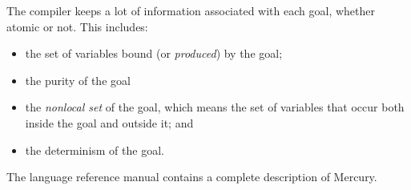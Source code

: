 The compiler keeps a lot of information associated with each goal,
whether atomic or not.
This includes:

\begin{itemize}
\item
the set of variables bound (or \emph{produced}) by the goal;
\item
the purity of the goal
\item
the \emph{nonlocal set} of the goal,
which means the set of variables
that occur both inside the goal and outside it; and
\item
the determinism of the goal.
\end{itemize}

\noindent
The language reference manual \citep{mercury_refman} contains a complete
description of Mercury.

